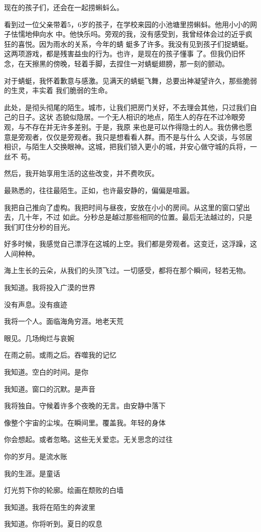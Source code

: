 		现在的孩子们，还会在一起捞蝌蚪么。

		看到过一位父亲带着5，6岁的孩子，在学校来园的小池塘里捞蝌蚪。他用小小的网子怯懦地伸向水
	中。他快乐吗。旁观的我，没有感受到，我曾经体会过的近乎疯狂的喜悦。因为雨水的关系，今年的蜻
	蜓多了许多。我没有见到孩子们捉蜻蜓。这两项游戏，都是残害益虫的行为。也许，是现在的孩子懂事
	了。但我仍旧怀念，在天擦黑的傍晚，轻着手脚，去捏住一对蜻蜓翅膀，那一刻的颤动。

		对于蜻蜓，我怀着歉意与感激。见满天的蜻蜓飞舞，总要出神凝望许久，那些脆弱的生灵，丰实着
	我们脆弱的生命。

		此处，是彻头彻尾的陌生。城市，让我们把房门关好，不去理会其他，只过我们自己的日子。这状
	态貌似隐居。一个无人相识的地点，陌生人的存在不过冷眼旁观，与不存在并无许多差别。于是，我原
	来也是可以作得隐士的人。我仿佛也愿意是旁观者，仅仅是旁观者。我只是想看看人群。而不是与什么
	人交谈，与邻居相识，与陌生人交换眼神。这城，把我们锁入更小的城，并安心做守城的兵将，一丝不
	苟。

		然后，我开始享用生活的这些改变，并不费吹灰。

		最熟悉的，往往最陌生。正如，也许最安静的，偏偏是喧嚣。

		我把自己推向了虚构。我把时间与昼夜，安放在小小的房间。从这里的窗口望出去，几十年，不过
	如此。分秒总是越过那些相同的位置。最后无法越过的，只是我们盯住分秒的目光。

		好多时候，我感觉自己漂浮在这城的上空。我们都是旁观者。这变迁，这浮躁，这人间种种。

		海上生长的云朵，从我们的头顶飞过。一切感受，都将在那个瞬间，轻若无物。

	\endwriting



		我知道。我将投入广漠的世界 \par
		没有声息。没有痕迹 \par
		我将一个人。面临海角穷涯。地老天荒 \par
		眼见。几场绚烂与哀婉 \par
		在雨之前。或雨之后。吞噬我的记忆 \par
		我知道。空白的时间。是你 \par
		我知道。窗口的沉默。是声音 \par
		我将独自。守候着许多个夜晚的无言。由安静中落下 \par
		像整个宇宙的尘埃。在瞬间里。覆盖我。年轻的身体 \par
		你会想起。或者忽略。这些无关爱恋。无关思念的过往 \par
		你的岁月。是流水账 \par
		我的生涯。是童话 \par
		灯光剪下你的轮廓。绘画在颓败的白墙 \par
		我知道。我将在陌生的奔波里 \par
		我知道。你将听到。夏日的叹息

